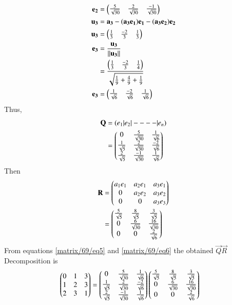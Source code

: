 \begin{enumerate}
\begin{align}
    \mathbf{e_2}&=\begin{pmatrix}\frac{5}{\sqrt{30}} & \frac{2}{\sqrt{30}} &\frac{-1}{\sqrt{30}}\end{pmatrix}\\
    \mathbf{u_3}&=\mathbf{a_3}-(\mathbf{a_3}\mathbf{e_1})\mathbf{e_1}-(\mathbf{a_3}\mathbf{e_2})\mathbf{e_2}
    \\
    \mathbf{u_3}&=\begin{pmatrix}\frac{1}{3} & \frac{-2}{3} &\frac{1}{3}\end{pmatrix}\\
    \mathbf{e_3}&=\frac{\mathbf{u_3}}{\left\lVert\mathbf{u_3}\right\rVert}\\
    &=\frac{\begin{pmatrix}\frac{1}{3} & \frac{-2}{3} & \frac{1}{4}\end{pmatrix}}{\sqrt{\frac{1}{9}+\frac{4}{9}+\frac{1}{9}}}\\
    \mathbf{e_3}&=\begin{pmatrix}\frac{1}{\sqrt{6}} & \frac{-2}{\sqrt{6}} &\frac{1}{\sqrt{6}}\end{pmatrix}
    \end{align}
    Thus,
    \begin{align}
     \mathbf{Q}&=(e_1|e_2|----|e_n)\\
     &=\begin{pmatrix}0 & \frac{5}{\sqrt{30}} & \frac{1}{\sqrt{6}}\\\frac{1}{\sqrt{5}} & \frac{2}{\sqrt{30}} & \frac{-2}{\sqrt{6}}\\\frac{2}{\sqrt{5}} & \frac{-1}{\sqrt{30}} & \frac{1}{\sqrt{6}}\end{pmatrix}\label{matrix/69/eq5}      
    \end{align}
    Then
    \begin{align}
      \mathbf{R}&=\begin{pmatrix}a_1e_1 & a_2e_1 & a_3e_1\\ 0 & a_2e_2 & a_3e_2\\0 & 0 & a_3e_3\end{pmatrix}\\
      &=\begin{pmatrix}\frac{5}{\sqrt{5}} & \frac{8}{\sqrt{5}} & \frac{3}{\sqrt{5}}\\0 &  \frac{6}{\sqrt{30}} & \frac{16}{\sqrt{30}}\\0 & 0 & \frac{2}{\sqrt{6}}\end{pmatrix}\label{matrix/69/eq6} 
      \end{align}
    From equations \eqref{matrix/69/eq5} and \eqref{matrix/69/eq6} the obtained $\vec{Q} \vec{R}$ Decomposition is
    \begin{align}
     \begin{pmatrix}0  & 1 & 3 \\ 1 & 2 & 3 \\ 2 & 3 & 1\end{pmatrix}&= \begin{pmatrix}0 & \frac{5}{\sqrt{30}} & \frac{1}{\sqrt{6}}\\\frac{1}{\sqrt{5}} & \frac{2}{\sqrt{30}} & \frac{-2}{\sqrt{6}}\\\frac{2}{\sqrt{5}} & \frac{-1}{\sqrt{30}} & \frac{1}{\sqrt{6}}\end{pmatrix}\begin{pmatrix}\frac{5}{\sqrt{5}} & \frac{8}{\sqrt{5}} & \frac{3}{\sqrt{5}}\\0 &  \frac{6}{\sqrt{30}} & \frac{16}{\sqrt{30}}\\0 & 0 & \frac{2}{\sqrt{6}}\end{pmatrix} 
    \end{align}
    \end{enumerate}